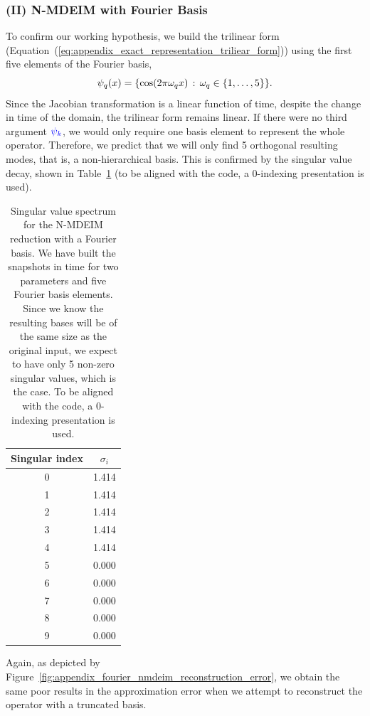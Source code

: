 \documentclass[../../thesis.tex]{subfiles}
\begin{document}
\subsubsection{(II) N-MDEIM with Fourier Basis}
To confirm our working hypothesis, 
we build the trilinear form 
(Equation~(\ref{eq:appendix_exact_representation_triliear_form}))
using the first five elements of the Fourier basis,
\begin{equation}
    \psi_q(x) = \qty{\cos(2 \pi \omega_q x) \, : \, \omega_q \in \qty{1, \ldots, 5}}.
\end{equation}
Since the Jacobian transformation is a linear function of time, 
despite the change in time of the domain, the trilinear form remains linear.
If there were no third argument 
$\textcolor{blue}{\psi_k}$, 
we would only require one basis element to represent the whole operator.
Therefore, we predict that we will only find 5 orthogonal resulting modes, that is, a non-hierarchical basis. 
This is confirmed by the singular value decay, 
shown in Table~\ref{tab:ndeim_with_fourier_modes}
(to be aligned with the code, a 0-indexing presentation is used).

\begin{table}[h]
    \centering
    \caption{Singular value spectrum for the N-MDEIM reduction with a Fourier basis.
    We have built the snapshots in time for two parameters and five Fourier basis elements.
    Since we know the resulting bases will be of the same size as the original input,
    we expect to have only 5 non-zero singular values, which is the case.
    To be aligned with the code, a 0-indexing presentation is used.}
    \begin{tabular}{cc}
        \toprule
        Singular index & $\sigma_i$ \\
        \midrule
        0 &  1.414 \\
        1 &  1.414 \\
        2 &  1.414 \\
        3 &  1.414 \\
        4 &  1.414 \\
        5 &  0.000 \\
        6 &  0.000 \\
        7 &  0.000 \\
        8 &  0.000 \\
        9 &  0.000 \\
        \bottomrule
    \end{tabular}
    \label{tab:ndeim_with_fourier_modes}
\end{table}
Again, as depicted by Figure~\ref{fig:appendix_fourier_nmdeim_reconstruction_error},
we obtain the same poor results in the approximation error when
we attempt to reconstruct the operator with a truncated basis. 
\end{document}
